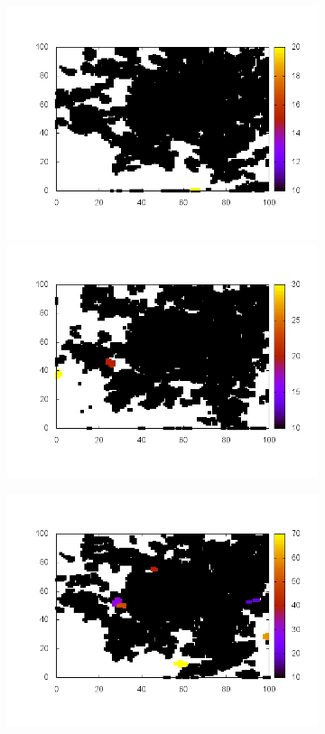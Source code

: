 \documentclass[10pt,a4paper]{article}
\begin{document}
\begin{figure}
\centering
\begin{subfigure}[b]{1\textwidth}
\includegraphics[scale=.5]{./img/stampe/scc1/12.png}
\includegraphics[scale=.5]{./img/stampe/scc1/13.png}
\end{subfigure}
\begin{subfigure}[b]{1\textwidth}
\includegraphics[scale=.5]{./img/stampe/scc1/14.png}

\end{subfigure}
\end{figure}
\end{document}

